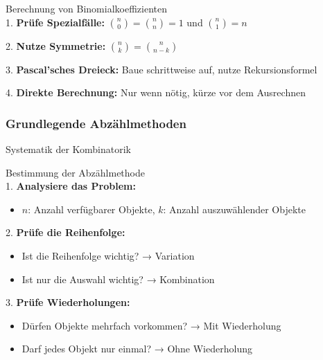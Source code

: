 \begin{KR}{Berechnung von Binomialkoeffizienten}\\
1. \textbf{Prüfe Spezialfälle:} $\binom{n}{0} = \binom{n}{n} = 1$ und $\binom{n}{1} = n$

2. \textbf{Nutze Symmetrie:} $\binom{n}{k} = \binom{n}{n-k}$

3. \textbf{Pascal'sches Dreieck:} Baue schrittweise auf, nutze Rekursionsformel

4. \textbf{Direkte Berechnung:} Nur wenn nötig, kürze vor dem Ausrechnen
\end{KR}

\subsubsection{Grundlegende Abzählmethoden}

\begin{concept}{Systematik der Kombinatorik}
\vspace{1mm}\\
\end{concept}

\begin{KR}{Bestimmung der Abzählmethode}\\
1. \textbf{Analysiere das Problem:}
   \begin{itemize}
   \item $n$: Anzahl verfügbarer Objekte, $k$: Anzahl auszuwählender Objekte
   \end{itemize}

2. \textbf{Prüfe die Reihenfolge:}
   \begin{itemize}
   \item Ist die Reihenfolge wichtig? → Variation
   \item Ist nur die Auswahl wichtig? → Kombination
   \end{itemize}

3. \textbf{Prüfe Wiederholungen:}
   \begin{itemize}
   \item Dürfen Objekte mehrfach vorkommen? → Mit Wiederholung
   \item Darf jedes Objekt nur einmal? → Ohne Wiederholung
   \end{itemize}
\end{KR}


